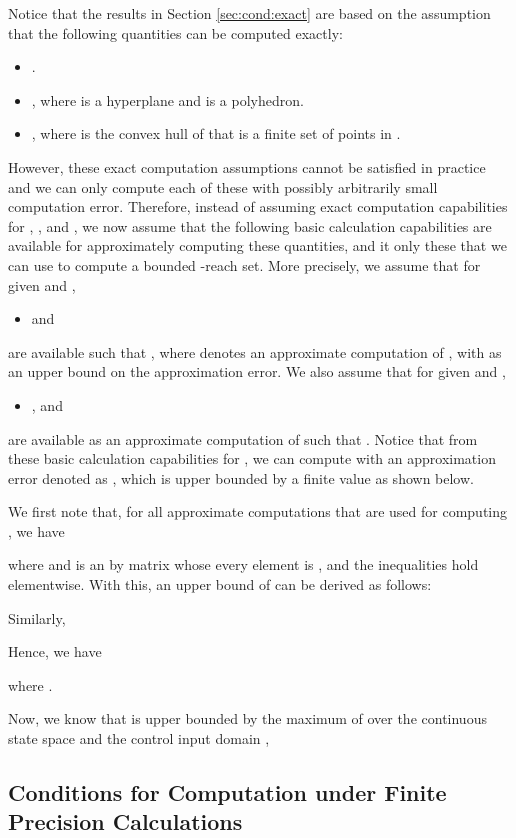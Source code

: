 Notice that the results in Section \ref{sec:cond:exact} are based on the assumption that the following quantities can be computed exactly:
\begin{itemize}
\item .
\item , where  is a hyperplane and  is a polyhedron.
\item , where  is the convex hull of  that is a finite set of points in .
\end{itemize}
However, these exact computation assumptions cannot be satisfied in practice and we can only compute each of these with possibly arbitrarily small computation error. 
Therefore, instead of assuming exact computation capabilities for , , and , we now assume that the following basic calculation capabilities are available for approximately computing these quantities, and it only these that we can use to compute a bounded -reach set. 
More precisely, we assume that for given  and , 
\begin{itemize}
	\item  and 
\end{itemize}
are available such that , where  denotes an approximate computation of , with  as an upper bound on the approximation error.
We also assume that for given  and ,
\begin{itemize}
	\item , and 
\end{itemize}
are available as an approximate computation of  such that .
Notice that from these basic calculation capabilities for , we can compute  with an approximation error  denoted as , which is upper bounded by a finite value as shown below.


We first note that, for all approximate computations  that are used for computing , we have 

where  and  is an  by  matrix whose every element is , and the inequalities hold elementwise.
With this, an upper bound of  can be derived as follows:

Similarly, 

Hence, we have 

where .

Now, we know that  is upper bounded by the maximum of  over the continuous state space  and the control input domain ,




\subsection{Conditions for Computation under Finite Precision Calculations}  \label{sec:cond:inexact}

